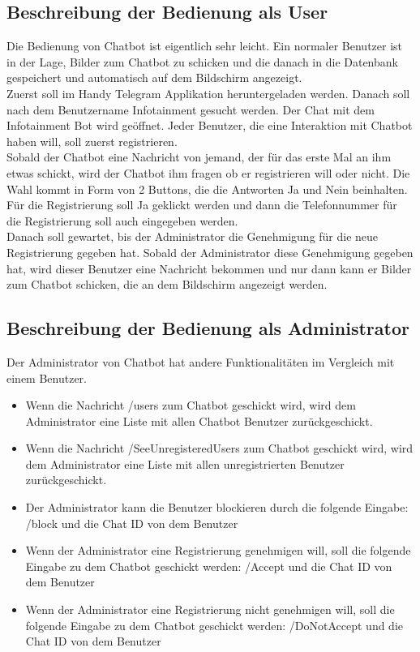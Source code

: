 \subsection{Beschreibung der Bedienung als User}
Die Bedienung von Chatbot ist eigentlich sehr leicht. Ein normaler Benutzer ist in der Lage, Bilder zum Chatbot zu schicken und die danach in die Datenbank gespeichert und automatisch auf dem Bildschirm angezeigt. \\
Zuerst soll im Handy Telegram Applikation heruntergeladen werden. Danach soll nach dem Benutzername Infotainment gesucht werden. Der Chat mit dem Infotainment Bot wird geöffnet. 
Jeder Benutzer, die eine Interaktion mit Chatbot haben will, soll zuerst registrieren. \\
Sobald der Chatbot eine Nachricht von jemand, der für das erste Mal an ihm etwas schickt, wird der Chatbot ihm fragen ob er registrieren will oder nicht. Die Wahl kommt in Form von 2 Buttons, die die Antworten Ja und Nein beinhalten.\\
Für die Registrierung soll Ja geklickt werden und dann die Telefonnummer für die Registrierung soll auch eingegeben werden. \\
Danach soll gewartet, bis der Administrator die Genehmigung für die neue Registrierung gegeben hat. Sobald der Administrator diese Genehmigung gegeben hat, wird dieser Benutzer eine Nachricht bekommen und nur dann kann er Bilder zum Chatbot schicken, die an dem Bildschirm angezeigt werden.
\subsection{Beschreibung der Bedienung als Administrator}
Der Administrator von Chatbot hat andere Funktionalitäten im Vergleich mit einem Benutzer. 
\begin{itemize}
	\item Wenn die Nachricht /users zum Chatbot geschickt wird, wird dem Administrator eine Liste mit allen Chatbot Benutzer zurückgeschickt.
\end{itemize}
\begin{itemize}
	\item Wenn die Nachricht /SeeUnregisteredUsers zum Chatbot geschickt wird, wird dem Administrator eine Liste mit allen unregistrierten Benutzer zurückgeschickt.
\end{itemize}
\begin{itemize}
	\item Der Administrator kann die Benutzer blockieren durch die folgende Eingabe: /block und die Chat ID von dem Benutzer 
\end{itemize}
\begin{itemize}
	\item Wenn der Administrator eine Registrierung genehmigen will, soll die folgende Eingabe zu dem Chatbot geschickt werden: /Accept und die Chat ID von dem Benutzer
\end{itemize}
\begin{itemize}
	\item Wenn der Administrator eine Registrierung nicht genehmigen will, soll die folgende Eingabe zu dem Chatbot geschickt werden: /DoNotAccept und die Chat ID von dem Benutzer
\end{itemize}
